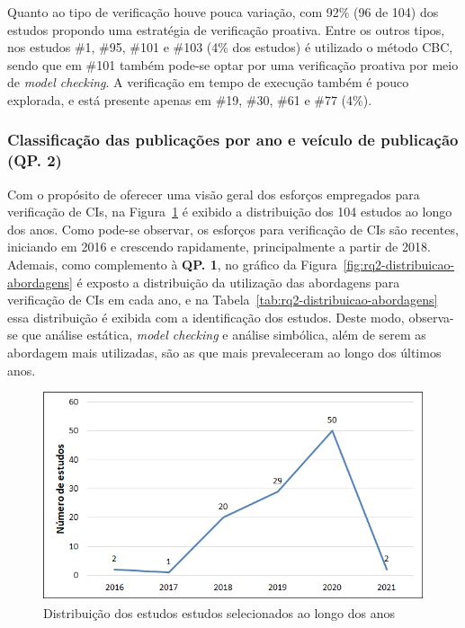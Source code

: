 Quanto ao tipo de verificação houve pouca variação, com 92\% (96 de 104) dos estudos propondo uma estratégia de verificação proativa. Entre os outros tipos, nos estudos \#1, \#95, \#101 e \#103 (4\% dos estudos) é utilizado o método CBC, sendo que em \#101 também pode-se optar por uma verificação proativa por meio de \textit{model checking}. A verificação em tempo de execução também é pouco explorada, e está presente apenas em \#19, \#30, \#61 e \#77 (4\%). 




\subsubsection*{\textbf{Classificação das publicações por ano e veículo de publicação (QP. 2)}}

Com o propósito de oferecer uma visão geral dos esforços empregados para verificação de CIs, na Figura~\ref{fig:rq2-distribuicao-estudos} é exibido a distribuição dos 104 estudos ao longo dos anos. Como pode-se observar, os esforços para verificação de CIs são recentes, iniciando em 2016 e crescendo rapidamente, principalmente a partir de 2018. Ademais, como complemento à \textbf{QP. 1}, no gráfico da Figura~\ref{fig:rq2-distribuicao-abordagens} é exposto a distribuição da utilização das abordagens para verificação de CIs em cada ano, e na Tabela~\ref{tab:rq2-distribuicao-abordagens} essa distribuição é exibida com a identificação dos estudos. Deste modo, observa-se que análise estática, \textit{model checking} e análise simbólica, além de serem as abordagem mais utilizadas, são as que mais prevaleceram ao longo dos últimos anos. 

\begin{figure}[!htb]
 \caption{Distribuição dos estudos estudos selecionados ao longo dos anos}
 \label{fig:rq2-distribuicao-estudos}
 \centering
 \includegraphics[scale=0.6]{figuras/rq2-distribuicao-estudos.png}
 \fdadospesquisa
\end{figure}

